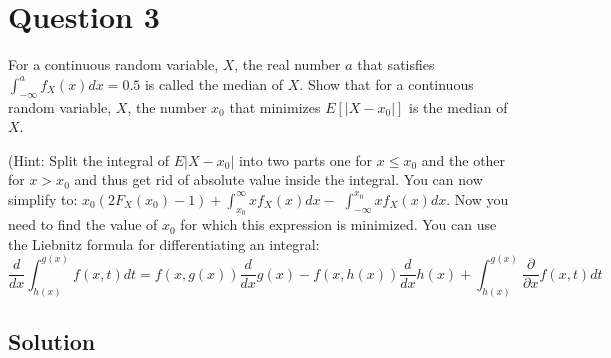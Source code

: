 \section*{Question 3}

For a continuous random variable, \( X \), the real number \( a \) that satisfies \( \int_{-\infty}^{a} f_{X}(x) d x=0.5 \) is called the median of \( X \).
Show that for a continuous random variable, \( X \), the number \( x_{0} \) that minimizes \( E\left[\left|X-x_{0}\right|\right] \) is the median of \( X \).

(Hint: Split the integral of \( E\left|X-x_{0}\right| \) into two parts one for \( x \leq x_{0} \) and the other for \( x>x_{0} \) and thus get rid of absolute value inside the integral.
You can now simplify to: \( x_{0}\left(2 F_{X}\left(x_{0}\right)-1\right)+\int_{x_{0}}^{\infty} x f_{X}(x) d x- \) \( \int_{-\infty}^{x_{0}} x f_{X}(x) d x \).
Now you need to find the value of \( x_{0} \) for which this expression is minimized.
You can use the Liebnitz formula for differentiating an integral:
\begin{equation*}
    \frac{d}{d x} \int_{h(x)}^{g(x)} f(x, t) d t=f(x, g(x)) \frac{d}{d x} g(x)-f(x, h(x)) \frac{d}{d x} h(x)+\int_{h(x)}^{g(x)} \frac{\partial}{\partial x} f(x, t) d t
\end{equation*}

\subsection*{Solution}
